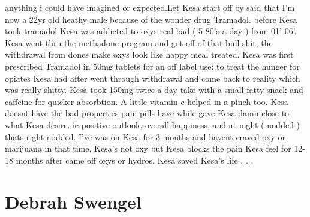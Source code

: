\documentclass[12pt]{book}
\begin{document}
anything i could have imagined or expected.Let Kesa start off by said that I'm now a 22yr old heathy male because of the wonder drug Tramadol. before Kesa took tramadol Kesa was addicted to oxys real bad ( 5 80's a day ) from 01'-06'. Kesa went thru the methadone program and got off of that bull shit, the withdrawal from dones make oxys look like happy meal treated. Kesa was first prescribed Tramadol in 50mg tablets for an off label use: to treat the hunger for opiates Kesa had after went through withdrawal and come back to reality which was really shitty. Kesa took 150mg twice a day take with a small fatty snack and caffeine for quicker absorbtion. A little vitamin c helped in a pinch too. Kesa doesnt have the bad properties pain pills have while gave Kesa damn close to what Kesa desire. ie positive outlook, overall happiness, and at night ( nodded ) thats right nodded. I've was on Kesa for 3 months and havent craved oxy or marijuana in that time. Kesa's not oxy but Kesa blocks the pain Kesa feel for 12-18 months after came off oxys or hydros. Kesa saved Kesa's life . . . 



\chapter{Debrah Swengel}
\end{document}
